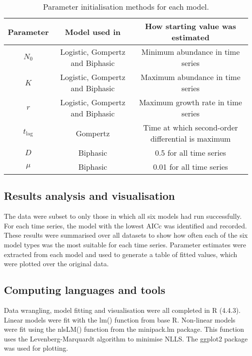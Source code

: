 \documentclass{article}
\begin{document}
\newpage

\begin{table}[h!]
\centering
\caption{Parameter initialisation methods for each model.}
\begin{tabular}{|c|c|c|}
\hline
\textbf{Parameter} & \textbf{Model used in} & \textbf{How starting value was estimated} \\ \hline
\( N_0 \) & Logistic, Gompertz and Biphasic & Minimum abundance in time series \\ \hline
\( K \) & Logistic, Gompertz and Biphasic & Maximum abundance in time series \\ \hline
\( r \) & Logistic, Gompertz and Biphasic & Maximum growth rate in time series \\ \hline
\( t_{\text{lag}} \) & Gompertz & Time at which second-order differential is maximum \\ \hline
\( D \) & Biphasic & 0.5 for all time series \\ \hline
\( \mu \) & Biphasic & 0.01 for all time series \\ \hline
\end{tabular}

\label{tab:table1}
\end{table}


\subsection{Results analysis and visualisation}

The data were subset to only those in which all six models had run successfully. For each time series, the model with the lowest AICc was identified and recorded. These results were summarised over all datasets to show how often each of the six model types was the most suitable for each time series. Parameter estimates were extracted from each model and used to generate a table of fitted values, which were plotted over the original data.

\subsection{Computing languages and tools}

Data wrangling, model fitting and visualisation were all completed in R (4.4.3). Linear models were fit with the lm() function from base R. Non-linear models were fit using the nlsLM() function from the minipack.lm package. This function uses the Levenberg-Marquardt algorithm to minimise NLLS. The ggplot2 package was used for plotting.
\end{document}
